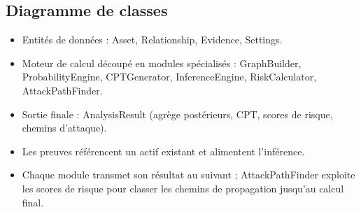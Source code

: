 \documentclass[12pt,a4paper]{article}
\newcommand{\forcereset}[1]{%
    \needspace{#1\baselineskip}%
}
\begin{document}
\newpage
\subsection{Diagramme de classes}
\forcereset{8}
\begin{itemize}[leftmargin=1.2cm, itemsep=0.2\baselineskip]
    \item Entités de données : Asset, Relationship, Evidence, Settings.
    \item Moteur de calcul découpé en modules spécialisés : GraphBuilder, ProbabilityEngine, CPTGenerator, InferenceEngine, RiskCalculator, AttackPathFinder.
    \item Sortie finale : AnalysisResult (agrège postérieurs, CPT, scores de risque, chemins d'attaque).
    \item Les preuves référencent un actif existant et alimentent l'inférence.
    \item Chaque module transmet son résultat au suivant ; AttackPathFinder exploite les scores de risque pour classer les chemins de propagation jusqu'au calcul final.
\end{itemize}
\end{document}

